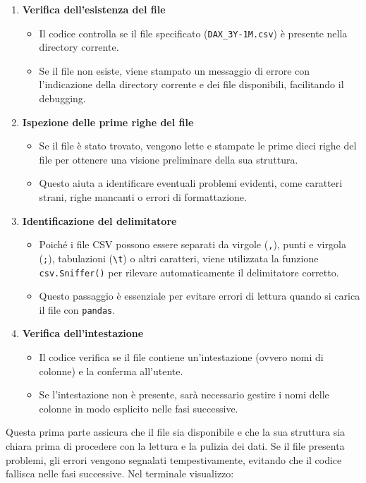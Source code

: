 \documentclass[%
	corpo=11pt,
    twoside,
    stile=classica,
    oldstyle,
    tipotesi=custom,
    greek,
    evenboxes,
]{toptesi}
\begin{document}
\begin{enumerate}
	\item \textbf{Verifica dell'esistenza del file}
	\begin{itemize}
		\item Il codice controlla se il file specificato (\texttt{DAX\_3Y-1M.csv}) è presente nella directory corrente.
		\item Se il file non esiste, viene stampato un messaggio di errore con l'indicazione della directory corrente e dei file disponibili, facilitando il debugging.
	\end{itemize}
	
	\item \textbf{Ispezione delle prime righe del file}
	\begin{itemize}
		\item Se il file è stato trovato, vengono lette e stampate le prime dieci righe del file per ottenere una visione preliminare della sua struttura.
		\item Questo aiuta a identificare eventuali problemi evidenti, come caratteri strani, righe mancanti o errori di formattazione.
	\end{itemize}
	
	\item \textbf{Identificazione del delimitatore}
	\begin{itemize}
		\item Poiché i file CSV possono essere separati da virgole (\texttt{,}), punti e virgola (\texttt{;}), tabulazioni (\texttt{\textbackslash t}) o altri caratteri, viene utilizzata la funzione \texttt{csv.Sniffer()} per rilevare automaticamente il delimitatore corretto.
		\item Questo passaggio è essenziale per evitare errori di lettura quando si carica il file con \texttt{pandas}.
	\end{itemize}
	
	\item \textbf{Verifica dell'intestazione}
	\begin{itemize}
		\item Il codice verifica se il file contiene un'intestazione (ovvero nomi di colonne) e la conferma all'utente.
		\item Se l'intestazione non è presente, sarà necessario gestire i nomi delle colonne in modo esplicito nelle fasi successive.
	\end{itemize}
\end{enumerate}

Questa prima parte assicura che il file sia disponibile e che la sua struttura sia chiara prima di procedere con la lettura e la pulizia dei dati. 
Se il file presenta problemi, gli errori vengono segnalati tempestivamente, evitando che il codice fallisca nelle fasi successive.
Nel terminale visualizzo:\\
\end{document}
